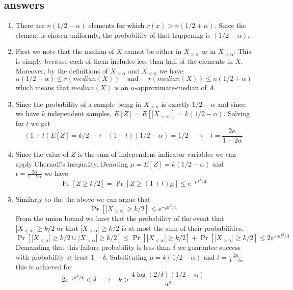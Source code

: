 \subsection*{answers}
\begin{enumerate}
\item There are $n(1/2 - \alpha)$ elements for which $r(x) > n(1/2 + \alpha)$.
Since the element is chosen uniformly, the probability of that happening is $(1/2 - \alpha)$.
\item First we note that the median of $X$ cannot be either in $X_{>\alpha}$ or in $X_{<\alpha}$.
This is simply because each of them includes less than half of the elements in $X$.
Moreover, by the definitions of $X_{>\alpha}$ and $X_{<\alpha}$ we have:
\[
n(1/2 - \alpha) \le r(median(X)) \;\;\;\;\mbox{and}\;\;\;\;\;  r(median(X))  \le n(1/2 + \alpha)
\]
which means that $median(X)$ is an $\alpha$-approximate-median of $A$.
\item Since the probability of a sample being in $X_{>\alpha}$ is exactly $1/2-\alpha$ 
and since we have $k$ independent samples, $E[Z] = E[|X_{>\alpha}|] = k(1/2-\alpha)$.
Solving for $t$ we get 
\[
(1+t)E[Z] = k/2 \;\;\rightarrow\;\;  (1+t)(1/2-\alpha) = 1/2 \;\;\;\rightarrow\;\;\; t = \frac{2\alpha}{1-2\alpha}
\]
\item Since the value of $Z$ is the sum of independent indicator variables we can apply Chernoff's inequality.
Denoting $\mu = E[Z] = k(1/2-\alpha)$ and $t = \frac{2\alpha}{1-2\alpha}$ we have:
\[
\Pr[Z \ge k/2] = \Pr[Z \ge (1+t)\mu] \le e^{-\mu t^2/4} 
\] 

\item Similarly to the the above we can argue that 
\[
\Pr[|X_{<\alpha}| \ge k/2] \le e^{-\mu t^2/4}
\]
From the union bound we have that the probability of the event that $|X_{<\alpha}| \ge k/2$
or that $|X_{>\alpha}| \ge k/2$ is at most the sum of their probabilities.
\[
\Pr \left[|X_{<\alpha}| \ge k/2 \cup |X_{>\alpha}| \ge k/2 \right] \le \Pr\left[|X_{<\alpha}| \ge k/2\right] + \Pr[|X_{>\alpha}| \ge k/2] \le 2e^{-\mu t^2/4}
\] 
Demanding that this failure probability is less than $\delta$ we guarantee success with probability at least $1-\delta$.
Substituting $\mu = k(1/2- \alpha)$ and $t = \frac{2\alpha}{1-2\alpha}$ this is achieved for 
\[
2e^{-\mu t^2/4} < \delta \;\;\;\rightarrow\;\;\; k > \frac{4\log(2/\delta)(1/2-\alpha)}{\alpha^2}  
\]
\end{enumerate}

\pagebreak






